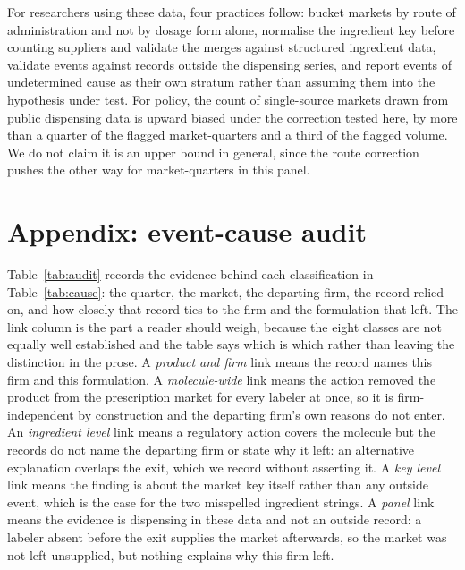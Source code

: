 \documentclass[pdflatex,sn-vancouver-num,Numbered]{sn-jnl}
\begin{document}
For researchers using these data, four practices follow: bucket markets by route of
administration and not by dosage form alone, normalise the ingredient key before counting
suppliers and validate the merges against structured ingredient data, validate events against
records outside the dispensing series, and report events of undetermined cause as their own
stratum rather than assuming them into the hypothesis under test. For policy, the count of single-source markets drawn from public
dispensing data is upward biased under the correction tested here, by more than a quarter of the
flagged market-quarters and a third of the flagged volume. We do not claim it is an upper bound
in general, since the route correction pushes the other way for \nRouteSplitCreated
market-quarters in this panel.

\section*{Appendix: event-cause audit}\label{sec:appendix}

Table~\ref{tab:audit} records the evidence behind each classification in
Table~\ref{tab:cause}: the quarter, the market, the departing firm, the record relied on, and
how closely that record ties to the firm and the formulation that left. The link column is the
part a reader should weigh, because the eight classes are not equally well established and the
table says which is which rather than leaving the distinction in the prose. A
\emph{product and firm} link means the record names this firm and this formulation. A
\emph{molecule-wide} link means the action removed the product from the prescription market for
every labeler at once, so it is firm-independent by construction and the departing firm's own
reasons do not enter. An \emph{ingredient level} link means a regulatory action covers the
molecule but the records do not name the departing firm or state why it left: an alternative
explanation overlaps the exit, which we record without asserting it. A \emph{key level} link
means the finding is about the market key itself rather than any outside event, which is the
case for the two misspelled ingredient strings. A \emph{panel} link means the evidence is
dispensing in these data and not an outside record: a labeler absent before the exit supplies
the market afterwards, so the market was not left unsupplied, but nothing explains why this
firm left.
\end{document}
